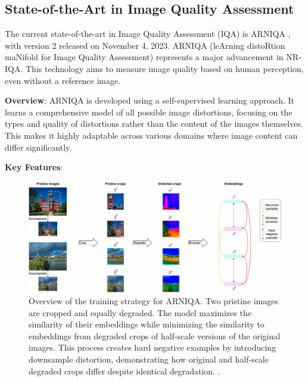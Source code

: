 \subsection{State-of-the-Art in Image Quality Assessment}
\label{sub:SOTA_IQA}
The current state-of-the-art in Image Quality Assessment (IQA) is ARNIQA \autocite{ARNIQA}, with version 2 released on November 4, 2023. ARNIQA (leArning distoRtion maNifold for Image Quality Assessment) represents a major advancement in NR-IQA. This technology aims to measure image quality based on human perception, even without a reference image. \par
\vspace{\baselineskip}
\noindent
\textbf{Overview}: ARNIQA is developed using a self-supervised learning approach. It learns a comprehensive model of all possible image distortions, focusing on the types and quality of distortions rather than the content of the images themselves. This makes it highly adaptable across various domains where image content can differ significantly. \par
\vspace{\baselineskip}
\noindent
\textbf{Key Features}:
\begin{figure}[ht]
    \centering
    \includegraphics[keepaspectratio,width=15cm]{img/method_SimCLR.jpg}
    \caption{Overview of the training strategy for ARNIQA. Two pristine images are cropped and equally degraded. The model maximizes the similarity of their embeddings while minimizing the similarity to embeddings from degraded crops of half-scale versions of the original images. This process creates hard negative examples by introducing downsample distortion, demonstrating how original and half-scale degraded crops differ despite identical degradation. \autocite{ARNIQA}.}
    \label{fig:SimCLR}
\end{figure}
